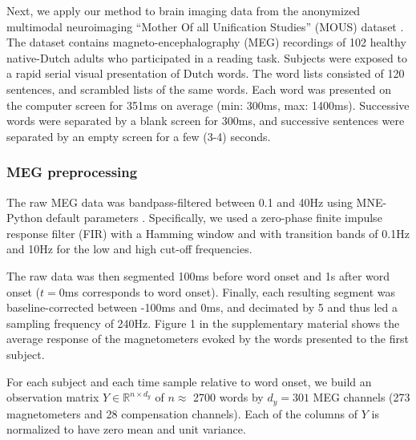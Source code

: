 
Next, we apply our method to brain imaging data from the anonymized multimodal
neuroimaging ``Mother Of all Unification Studies'' (MOUS) dataset
\citep{schoffelen2019204}. The dataset contains magneto-encephalography (MEG)
recordings of 102 healthy native-Dutch adults who participated in a reading
task.
%
Subjects were exposed to a rapid serial visual presentation of Dutch words. The
word lists consisted of 120 sentences, and scrambled lists of the same words.
Each word was presented on the computer screen for 351ms on average (min: 300ms,
max: 1400ms). Successive words were separated by a blank screen for 300ms, and
successive sentences were separated by an empty screen for a few (3-4) seconds.

\subsubsection{MEG preprocessing}

The raw MEG data was bandpass-filtered between 0.1 and 40Hz using MNE-Python
default parameters \citep{gramfort2013meg, gramfort2014mne}. Specifically, we used a zero-phase finite impulse
response filter (FIR) with a Hamming window and with transition bands of 0.1Hz
and 10Hz for the low and high cut-off frequencies.

The raw data was then segmented 100ms before word onset and 1s after
word onset ($t=0$ms corresponds to word onset). Finally, each resulting
segment was baseline-corrected between -100ms and 0ms, and decimated by 5 and
thus led a sampling frequency of 240Hz. Figure 1 in the supplementary material
shows the average response of the magnetometers evoked by the words presented
to the first subject.

For each subject and each time sample relative to word onset, we
build an observation matrix $Y \in \mathbb{R}^{n \times d_y}$ of $n\approx$ 2700 words
by $d_y=301$ MEG channels (273 magnetometers and 28 compensation channels). Each
of the columns of $Y$ is normalized to have zero mean and unit variance.

